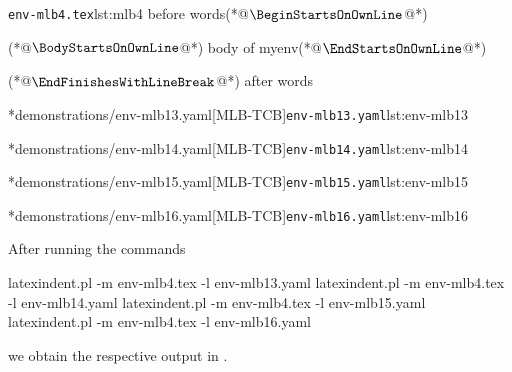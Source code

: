 	\begin{minipage}{.45\linewidth}
		\begin{cmhlistings}[style=tcblatex,escapeinside={(*@}{@*)}]{\texttt{env-mlb4.tex}}{lst:mlb4}
before words(*@$\BeginStartsOnOwnLine$@*)
\begin{myenv}(*@$\BodyStartsOnOwnLine$@*)
body of myenv(*@$\EndStartsOnOwnLine$@*)
\end{myenv}(*@$\EndFinishesWithLineBreak$@*)
after words
\end{cmhlistings}
	\end{minipage}%
	\hfill
	\begin{minipage}{.51\textwidth}
		\cmhlistingsfromfile[style=yaml-LST]*{demonstrations/env-mlb13.yaml}[MLB-TCB]{\texttt{env-mlb13.yaml}}{lst:env-mlb13}

		\cmhlistingsfromfile[style=yaml-LST]*{demonstrations/env-mlb14.yaml}[MLB-TCB]{\texttt{env-mlb14.yaml}}{lst:env-mlb14}

		\cmhlistingsfromfile[style=yaml-LST]*{demonstrations/env-mlb15.yaml}[MLB-TCB]{\texttt{env-mlb15.yaml}}{lst:env-mlb15}

		\cmhlistingsfromfile[style=yaml-LST]*{demonstrations/env-mlb16.yaml}[MLB-TCB]{\texttt{env-mlb16.yaml}}{lst:env-mlb16}
	\end{minipage}

	After running the commands \begin{commandshell}
latexindent.pl -m env-mlb4.tex -l env-mlb13.yaml
latexindent.pl -m env-mlb4.tex -l env-mlb14.yaml
latexindent.pl -m env-mlb4.tex -l env-mlb15.yaml
latexindent.pl -m env-mlb4.tex -l env-mlb16.yaml
\end{commandshell} 

	we obtain the respective output in .

	\begin{minipage}{.45\linewidth}
	\end{minipage}
	\hfill
	\begin{minipage}{.45\linewidth}
	\end{minipage}

	\begin{minipage}{.45\linewidth}
	\end{minipage}
	\hfill
	\begin{minipage}{.45\linewidth}
	\end{minipage}

